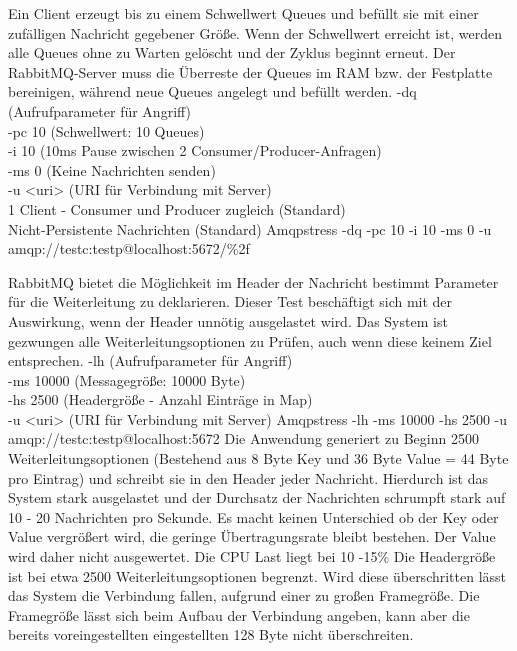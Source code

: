 \documentclass[	a4paper,
			11pt,
			titlepage,
			oneside,
			fleqn,
			listof=totoc,
			parskip,
			chapterprefix=false,
			numbers=noenddot]{scrartcl}
\begin{document}
\clearpage
		{Ein Client erzeugt bis zu einem Schwellwert Queues und befüllt sie mit einer zufälligen Nachricht gegebener Größe. Wenn der Schwellwert erreicht ist, werden alle Queues ohne zu Warten gelöscht und der Zyklus beginnt erneut. Der RabbitMQ-Server muss die Überreste der Queues im RAM bzw. der Festplatte bereinigen, während neue Queues angelegt und befüllt werden.}%
		{%
		 -dq (Aufrufparameter für Angriff) \\
		 -pc 10 (Schwellwert: 10 Queues) \\
		 -i 10 (10ms Pause zwischen 2 Consumer/Producer-Anfragen) \\
		 -ms 0 (Keine Nachrichten senden) \\
		 -u <uri> (URI für Verbindung mit Server) \\
		 1 Client - Consumer und Producer zugleich (Standard) \\
		 Nicht-Persistente Nachrichten (Standard)
		}%
		{Amqpstress -dq -pc 10 -i 10 -ms 0  -u amqp://testc:testp@localhost:5672/\%2f}%
		{}

\clearpage
		{RabbitMQ bietet die Möglichkeit im Header der Nachricht bestimmt Parameter für die Weiterleitung zu deklarieren. Dieser Test beschäftigt sich mit der Auswirkung, wenn der Header unnötig ausgelastet wird. Das System ist gezwungen alle Weiterleitungsoptionen zu Prüfen, auch wenn diese keinem Ziel entsprechen.}%
		{%
		 -lh (Aufrufparameter für Angriff) \\
		 -ms 10000 (Messagegröße: 10000 Byte) \\
		 -hs 2500 (Headergröße - Anzahl Einträge in Map) \\
		 -u <uri> (URI für Verbindung mit Server)
		}%
		{Amqpstress -lh -ms 10000 -hs 2500 -u amqp://testc:testp@localhost:5672}%
		{Die Anwendung generiert zu Beginn 2500 Weiterleitungsoptionen (Bestehend aus 8 Byte Key und 36 Byte Value = 44 Byte pro Eintrag) und schreibt sie in den Header jeder Nachricht. Hierdurch ist das System stark ausgelastet und der Durchsatz der Nachrichten schrumpft stark auf 10 - 20 Nachrichten pro Sekunde. Es macht keinen Unterschied ob der Key oder Value vergrößert wird, die geringe Übertragungsrate bleibt bestehen. Der Value wird daher nicht ausgewertet. Die CPU Last liegt bei 10 -15\%}
		{Die Headergröße ist bei etwa 2500 Weiterleitungsoptionen begrenzt. Wird diese überschritten lässt das System die Verbindung fallen, aufgrund einer zu großen Framegröße. Die Framegröße lässt sich beim Aufbau der Verbindung angeben, kann aber die bereits voreingestellten eingestellten 128 Byte nicht überschreiten.}
\end{document}

